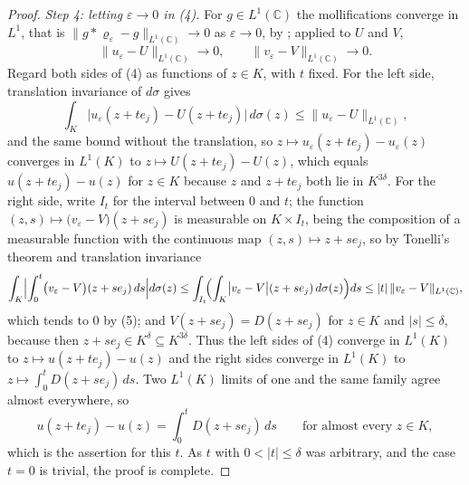 \begin{proof}
\emph{Step 4: letting $\varepsilon\to0$ in (4).}  For $g\in L^{1}(\mathbb{C})$
the mollifications converge in $L^1$, that is
$\|g*\varrho_\varepsilon-g\|_{L^{1}(\mathbb{C})}\to0$ as $\varepsilon\to0$, by
; applied to $U$ and $V$,
\begin{equation}\tag{5}
  \|u_\varepsilon-U\|_{L^{1}(\mathbb{C})}\to0,\qquad
  \|v_\varepsilon-V\|_{L^{1}(\mathbb{C})}\to0 .
\end{equation}
Regard both sides of (4) as functions of $z\in K$, with $t$ fixed.  For the
left side, translation invariance of $d\sigma$ gives
\[
  \int_K\bigl|u_\varepsilon(z+te_j)-U(z+te_j)\bigr|\,d\sigma(z)
  \le\|u_\varepsilon-U\|_{L^{1}(\mathbb{C})},
\]
and the same bound without the translation, so
$z\mapsto u_\varepsilon(z+te_j)-u_\varepsilon(z)$ converges in $L^{1}(K)$ to
$z\mapsto U(z+te_j)-U(z)$, which equals $u(z+te_j)-u(z)$ for $z\in K$ because
$z$ and $z+te_j$ both lie in $K^{3\delta}$.  For the right side, write $I_t$
for the interval between $0$ and $t$; the function
$(z,s)\mapsto\bigl(v_\varepsilon-V\bigr)(z+se_j)$ is measurable on
$K\times I_t$, being the composition of a measurable function with the
continuous map $(z,s)\mapsto z+se_j$, so by Tonelli's theorem and translation
invariance
\[
  \int_K\Bigl|\int_0^t\bigl(v_\varepsilon-V\bigr)(z+se_j)\,ds\Bigr|
    d\sigma(z)
  \le\int_{I_t}\!\Bigl(\int_K\bigl|v_\varepsilon-V\bigr|(z+se_j)
    \,d\sigma(z)\Bigr)ds
  \le|t|\,\|v_\varepsilon-V\|_{L^{1}(\mathbb{C})},
\]
which tends to $0$ by (5); and $V(z+se_j)=D(z+se_j)$ for $z\in K$ and
$|s|\le\delta$, because then $z+se_j\in K^{\delta}\subseteq K^{3\delta}$.
Thus the left sides of (4) converge in $L^1(K)$ to
$z\mapsto u(z+te_j)-u(z)$ and the right sides converge in $L^1(K)$ to
$z\mapsto\int_0^tD(z+se_j)\,ds$.  Two $L^{1}(K)$ limits of one and the same
family agree almost everywhere, so
\[
  u(z+te_j)-u(z)=\int_0^tD(z+se_j)\,ds
  \qquad\text{for almost every }z\in K,
\]
which is the assertion for this $t$.  As $t$ with $0<|t|\le\delta$ was
arbitrary, and the case $t=0$ is trivial, the proof is complete.
\end{proof}
